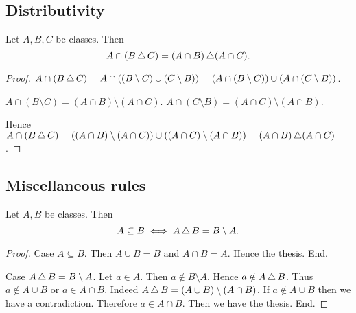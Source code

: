 \documentclass[../set-theory.tex]{subfiles}
\begin{document}
  \subsection*{Distributivity}

  \begin{forthel}
    \begin{proposition}
      Let $A, B, C$ be classes.
      Then \[ A \cap (B \mathop{\triangle} C) = (A \cap B) \mathop{\triangle} (A \cap C). \]
    \end{proposition}
    \begin{proof}
      $A \cap (B \mathop{\triangle} C) = A \cap ((B \setminus C) \cup (C \setminus B)) = (A \cap (B \setminus C)) \cup (A \cap (C \setminus B))$.

      $A \cap (B \setminus C) = (A \cap B) \setminus (A \cap C)$.
      $A \cap (C \setminus B) = (A \cap C) \setminus (A \cap B)$.

      Hence $A \cap (B \mathop{\triangle} C) = ((A \cap B) \setminus (A \cap C)) \cup ((A \cap C) \setminus (A \cap B)) = (A \cap B) \mathop{\triangle} (A \cap C)$.
    \end{proof}
  \end{forthel}


  \subsection*{Miscellaneous rules}

  \begin{forthel}
    \begin{proposition}
      Let $A, B$ be classes.
      Then \[ A \subseteq B \iff A \mathop{\triangle} B = B \setminus A. \]
    \end{proposition}
    \begin{proof}
      Case $A \subseteq B$.
        Then $A \cup B = B$ and $A \cap B = A$.
        Hence the thesis.
      End.

      Case $A \mathop{\triangle} B = B \setminus A$.
        Let $a \in A$.
        Then $a \notin B \setminus A$.
        Hence $a \notin A \mathop{\triangle} B$.
        Thus $a \notin A \cup B$ or $a \in A \cap B$.
        Indeed $A \mathop{\triangle} B = (A \cup B) \setminus (A \cap B)$.
        If $a \notin A \cup B$ then we have a contradiction.
        Therefore $a \in A \cap B$.
        Then we have the thesis.
      End.
    \end{proof}
  \end{forthel}
\end{document}
